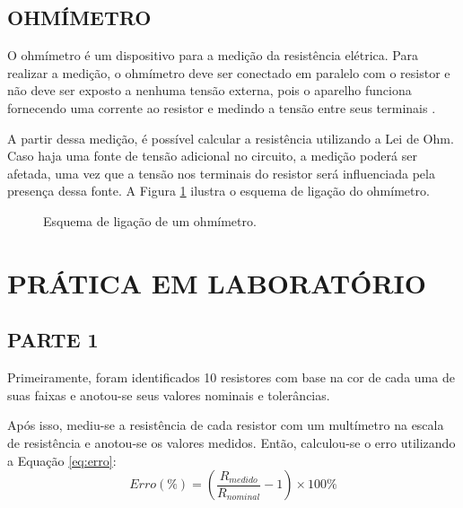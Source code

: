 \documentclass[12pt]{article}
\begin{document}
    \subsection{OHMÍMETRO}
    O ohmímetro é um dispositivo para a medição da resistência elétrica. Para realizar a medição, o ohmímetro deve ser conectado em paralelo com o resistor e não deve ser exposto a nenhuma tensão externa, pois o aparelho funciona fornecendo uma corrente ao resistor e medindo a tensão entre seus terminais \parencite{ohmmeter_website}.
    
    A partir dessa medição, é possível calcular a resistência utilizando a Lei de Ohm. Caso haja uma fonte de tensão adicional no circuito, a medição poderá ser afetada, uma vez que a tensão nos terminais do resistor será influenciada pela presença dessa fonte. A Figura \ref{fig:ohmimetro} ilustra o esquema de ligação do ohmímetro.
    \begin{figure}[H]
        \centering
        \caption{Esquema de ligação de um ohmímetro.}
        \begin{minipage}{0.5\textwidth}
            \centering
            \label{fig:ohmimetro}
        \end{minipage}
    \end{figure}

\section{PRÁTICA EM LABORATÓRIO}
\subsection{PARTE 1}
Primeiramente, foram identificados 10 resistores com base na cor de cada uma de suas faixas  e anotou-se seus valores nominais e tolerâncias.

Após isso, mediu-se a resistência de cada resistor com um multímetro na escala de resistência e anotou-se os valores medidos. Então, calculou-se o erro utilizando a Equação \ref{eq:erro}:
\begin{equation}
    Erro(\%) = \left(\frac{R_{medido}}{R_{nominal}} -1\right)\times 100\%
    \label{eq:erro}
\end{equation}
\end{document}
